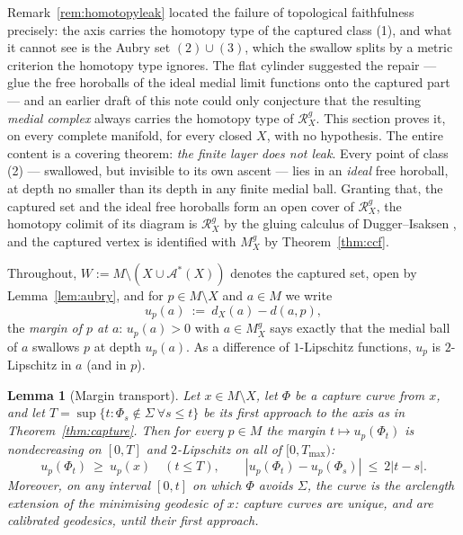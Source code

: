 \documentclass[11pt]{article}
\newtheorem{lemma}[theorem]{Lemma}
\theoremstyle{remark}
\newcommand{\X}{X}
\newcommand{\Mg}{M^{g}_{\X}}
\newcommand{\Rg}{\mathcal{R}^{g}_{\X}}
\newcommand{\dX}{d_{\X}}
\newcommand{\Aub}{\mathcal{A}^{\ast}}
\begin{document}
Remark~\ref{rem:homotopyleak} located the failure of topological
faithfulness precisely: the axis carries the homotopy type of the
captured class (1), and what it cannot see is the Aubry set
$(2)\cup(3)$, which the swallow splits by a metric criterion the
homotopy type ignores. The flat cylinder suggested the repair ---
glue the free horoballs of the ideal medial limit functions onto the
captured part --- and an earlier draft of this note could only
conjecture that the resulting \emph{medial complex} always carries
the homotopy type of $\Rg$. This section proves it, on every
complete manifold, for every closed $\X$, with no hypothesis. The
entire content is a covering theorem: \emph{the finite layer does
not leak}. Every point of class (2) --- swallowed, but invisible to
its own ascent --- lies in an \emph{ideal} free horoball, at depth
no smaller than its depth in any finite medial ball. Granting that,
the captured set and the ideal free horoballs form an open cover of
$\Rg$, the homotopy colimit of its diagram is $\Rg$ by the gluing
calculus of Dugger--Isaksen \cite{DI}, and the captured vertex is
identified with $\Mg$ by Theorem~\ref{thm:ccf}.

Throughout, $W:=M\setminus(\X\cup\Aub(\X))$ denotes the captured
set, open by Lemma~\ref{lem:aubry}, and for
$p\in M\setminus\X$ and $a\in M$ we write
\[
  u_{p}(a)\ :=\ \dX(a)-d(a,p),
\]
the \emph{margin of $p$ at $a$}: $u_{p}(a)>0$ with $a\in\Mg$ says
exactly that the medial ball of $a$ swallows $p$ at depth
$u_{p}(a)$. As a difference of $1$-Lipschitz functions, $u_{p}$ is
$2$-Lipschitz in $a$ (and in $p$).

\begin{lemma}[Margin transport]\label{lem:transport}
Let $x\in M\setminus\X$, let $\Phi$ be a capture curve from $x$, and
let $T=\sup\{t:\Phi_{s}\notin\Sigma\ \forall s\le t\}$ be its first
approach to the axis as in Theorem~\ref{thm:capture}. Then for every
$p\in M$ the margin $t\mapsto u_{p}(\Phi_{t})$ is nondecreasing on
$[0,T]$ and $2$-Lipschitz on all of $[0,T_{\max})$:
\[
  u_{p}(\Phi_{t})\ \ge\ u_{p}(x)\quad(t\le T),
  \qquad
  |u_{p}(\Phi_{t})-u_{p}(\Phi_{s})|\ \le\ 2|t-s| .
\]
Moreover, on any interval $[0,t]$ on which $\Phi$ avoids $\Sigma$,
the curve is the arclength extension of the minimising geodesic of
$x$: capture curves are unique, and are calibrated geodesics, until
their first approach.
\end{lemma}
\end{document}
